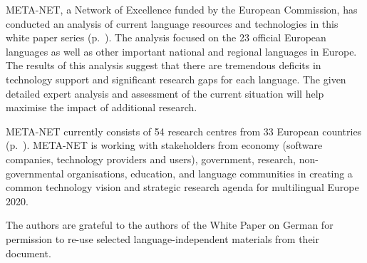\documentclass[]{../../metanetpaper}
\begin{document}
\begin{Parallel}[c]{78mm}{78mm}
{META-NET, a Network of Excellence funded by the European Commission, has conducted an  analysis of current language resources and technologies in this white paper series (p.~\pageref{whitepaperseries}). The analysis focused on the 23 official European languages as well as other important national and regional languages in Europe. The results of this analysis suggest that there are tremendous deficits in technology support and significant research gaps for each language. The given detailed expert analysis and assessment of the current situation will help maximise the impact of additional research.

META-NET currently consists of 54 research centres from 33 European countries (p.~\pageref{metanetmembers}). META-NET is working with stakeholders from economy (software companies, technology providers and users), government, research, non-governmental organisations, education, and language communities in  creating a common technology vision and strategic research agenda for multilingual Europe 2020.

The authors are grateful to the authors of the White Paper on German for permission to re-use selected language-independent materials from their document. } 


\ParallelPar
\end{Parallel}

\cleardoublepage



\tableofcontents


\cleardoublepage


\setcounter{page}{1}
\pagestyle{scrheadings}



\end{document}
